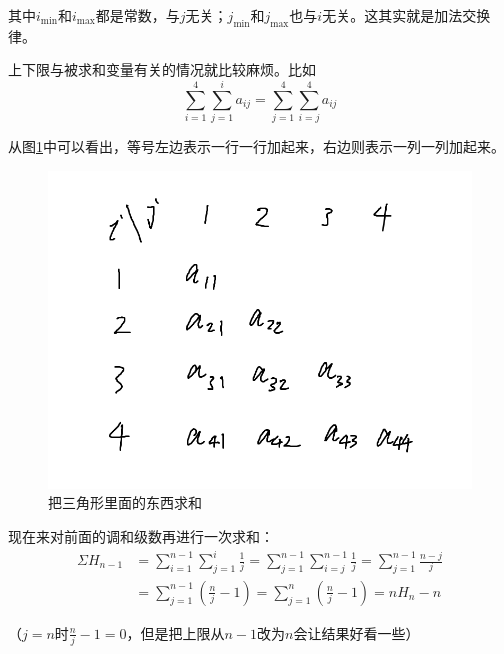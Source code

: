 其中$i_\text{min}$和$i_\text{max}$都是常数，与$j$无关；$j_\text{min}$和$j_\text{max}$也与$i$无关。这其实就是加法交换律。

上下限与被求和变量有关的情况就比较麻烦。比如
\begin{equation*}
\sum_{i=1}^4 \sum_{j=1}^i a_{i j}=\sum_{j=1}^4 \sum_{i=j}^4 a_{i j}
\end{equation*}

从图\ref{fig-triangle-sum}中可以看出，等号左边表示一行一行加起来，右边则表示一列一列加起来。
\begin{figure}[htb]
\centering
\includegraphics[scale=0.5]{fig/triangle-sum}
\caption{把三角形里面的东西求和}
\label{fig-triangle-sum}
\end{figure}

现在来对前面的调和级数再进行一次求和：
\begin{align*}
\Sigma H_{n-1}&=\sum_{i=1}^{n-1} \sum_{j=1}^i \frac{1}{j}=\sum_{j=1}^{n-1} \sum_{i=j}^{n-1} \frac{1}{j}=\sum_{j=1}^{n-1} \frac{n-j}{j} \\
&=\sum_{j=1}^{n-1} (\frac{n}{j}-1)=\sum_{j=1}^{n} (\frac{n}{j}-1)=n H_n-n
\end{align*}

（$j=n$时$\frac{n}{j}-1=0$，但是把上限从$n-1$改为$n$会让结果好看一些）

